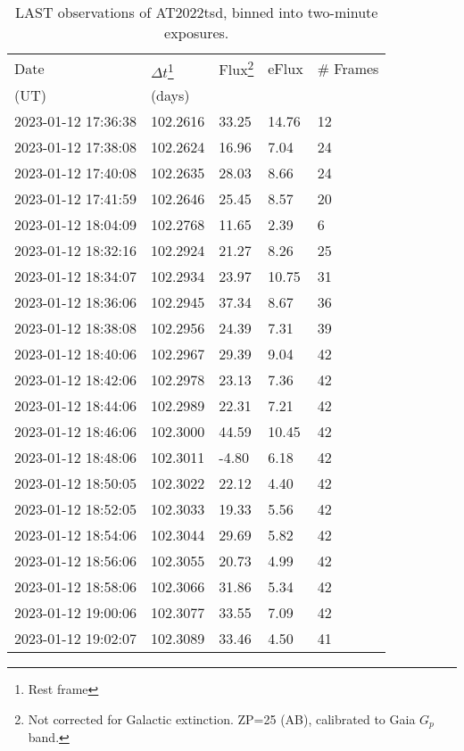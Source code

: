 \documentclass{nature_plusfigure}
\begin{document}
\begin{supplement}
\clearpage

\begin{center} 
\begin{longtable}{lllll} 
\caption{LAST observations of AT2022tsd, binned into two-minute exposures.} 
\label{tab:last-photometry}\\ 
\hline\hline
Date & $\Delta t$\footnote{Rest frame} & Flux\footnote{Not corrected for Galactic extinction. ZP=25 (AB), calibrated to Gaia $G_p$ band.} & eFlux & \# Frames\\ 
(UT) & (days) &  &  & \\ 
\hline
2023-01-12 17:36:38 & 102.2616 & 33.25 & 14.76 & 12 \\ 
2023-01-12 17:38:08 & 102.2624 & 16.96 & 7.04 & 24 \\ 
2023-01-12 17:40:08 & 102.2635 & 28.03 & 8.66 & 24 \\ 
2023-01-12 17:41:59 & 102.2646 & 25.45 & 8.57 & 20 \\ 
2023-01-12 18:04:09 & 102.2768 & 11.65 & 2.39 & 6 \\ 
2023-01-12 18:32:16 & 102.2924 & 21.27 & 8.26 & 25 \\ 
2023-01-12 18:34:07 & 102.2934 & 23.97 & 10.75 & 31 \\ 
2023-01-12 18:36:06 & 102.2945 & 37.34 & 8.67 & 36 \\ 
2023-01-12 18:38:08 & 102.2956 & 24.39 & 7.31 & 39 \\ 
2023-01-12 18:40:06 & 102.2967 & 29.39 & 9.04 & 42 \\ 
2023-01-12 18:42:06 & 102.2978 & 23.13 & 7.36 & 42 \\ 
2023-01-12 18:44:06 & 102.2989 & 22.31 & 7.21 & 42 \\ 
2023-01-12 18:46:06 & 102.3000 & 44.59 & 10.45 & 42 \\ 
2023-01-12 18:48:06 & 102.3011 & -4.80 & 6.18 & 42 \\ 
2023-01-12 18:50:05 & 102.3022 & 22.12 & 4.40 & 42 \\ 
2023-01-12 18:52:05 & 102.3033 & 19.33 & 5.56 & 42 \\ 
2023-01-12 18:54:06 & 102.3044 & 29.69 & 5.82 & 42 \\ 
2023-01-12 18:56:06 & 102.3055 & 20.73 & 4.99 & 42 \\ 
2023-01-12 18:58:06 & 102.3066 & 31.86 & 5.34 & 42 \\ 
2023-01-12 19:00:06 & 102.3077 & 33.55 & 7.09 & 42 \\ 
2023-01-12 19:02:07 & 102.3089 & 33.46 & 4.50 & 41 \\ 

\end{longtable}
\end{center}
\end{supplement}
\end{document}

